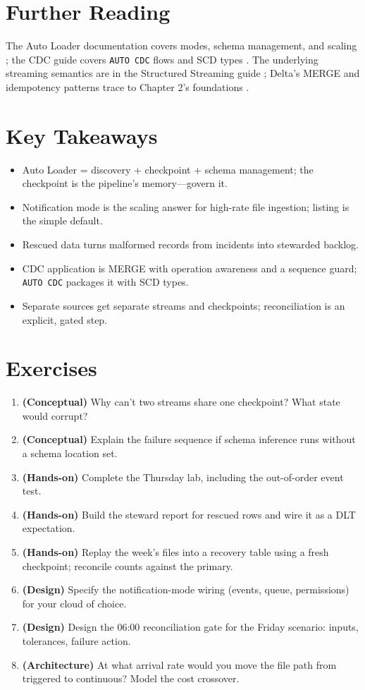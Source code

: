 \section{Further Reading}
The Auto Loader documentation covers modes, schema management, and scaling \cite{databricksAutoLoader}; the CDC guide covers \texttt{AUTO CDC} flows and SCD types \cite{databricksCDC}. The underlying streaming semantics are in the Structured Streaming guide \cite{sparkStructuredStreaming}; Delta's MERGE and idempotency patterns trace to Chapter 2's foundations \cite{deltaLakeDocs}.

\section*{Key Takeaways}
\begin{itemize}
    \item Auto Loader = discovery + checkpoint + schema management; the checkpoint is the pipeline's memory---govern it.
    \item Notification mode is the scaling answer for high-rate file ingestion; listing is the simple default.
    \item Rescued data turns malformed records from incidents into stewarded backlog.
    \item CDC application is MERGE with operation awareness and a sequence guard; \texttt{AUTO CDC} packages it with SCD types.
    \item Separate sources get separate streams and checkpoints; reconciliation is an explicit, gated step.
\end{itemize}

\section{Exercises}
\begin{enumerate}
    \item \textbf{(Conceptual)} Why can't two streams share one checkpoint? What state would corrupt?
    \item \textbf{(Conceptual)} Explain the failure sequence if schema inference runs without a schema location set.
    \item \textbf{(Hands-on)} Complete the Thursday lab, including the out-of-order event test.
    \item \textbf{(Hands-on)} Build the steward report for rescued rows and wire it as a DLT expectation.
    \item \textbf{(Hands-on)} Replay the week's files into a recovery table using a fresh checkpoint; reconcile counts against the primary.
    \item \textbf{(Design)} Specify the notification-mode wiring (events, queue, permissions) for your cloud of choice.
    \item \textbf{(Design)} Design the 06:00 reconciliation gate for the Friday scenario: inputs, tolerances, failure action.
    \item \textbf{(Architecture)} At what arrival rate would you move the file path from triggered to continuous? Model the cost crossover.
\end{enumerate}
